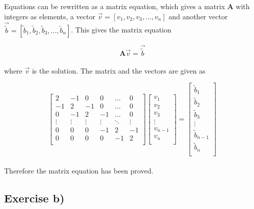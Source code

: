 \documentclass{article}
\begin{document}
  Equations can be rewritten as a matrix equation, which gives a matrix \textbf{A} with integers as elements, a vector $\vec{v} = [v_1, v_2, v_3, ... , v_n]$ and another vector $\vec{\tilde{b}} = [\tilde{b}_1, \tilde{b}_2, \tilde{b}_3, ... , \tilde{b}_n]$. This gives the matrix equation

  \begin{equation}
    \textbf{A} \vec{v} = \vec{\tilde{b}}  \label{eq:matrixeq}
  \end{equation} \\

  where $\vec{v}$ is the solution. The matrix and the vectors are given as

  \begin{equation*} \label{eq:fullmatrixeq}
    \begin{bmatrix}
      2 & -1 & 0 & 0 & \dots & 0 \\
      -1 & 2 & -1 & 0 & \dots & 0 \\
      0 & -1 & 2 & -1 & \dots & 0 \\
      \vdots & \vdots & \vdots & \vdots & \ddots & \vdots \\
      0 & 0 & 0 & -1 & 2 & -1 \\
      0 & 0 & 0 & 0 & -1 & 2 \\
    \end{bmatrix}
    \begin{bmatrix}
      v_1 \\
      v_2 \\
      v_3 \\
      \vdots \\
      v_{n-1} \\
      v_n \\
    \end{bmatrix}
    =
    \begin{bmatrix}
      \tilde{b}_1 \\
      \tilde{b}_2 \\
      \tilde{b}_3 \\
      \vdots \\
      \tilde{b}_{n-1} \\
      \tilde{b}_n \\
    \end{bmatrix}
  \end{equation*} \\

  Therefore the matrix equation has been proved. \\

\subsection{Exercise b)} \label{sec:Method b)}
\end{document}
